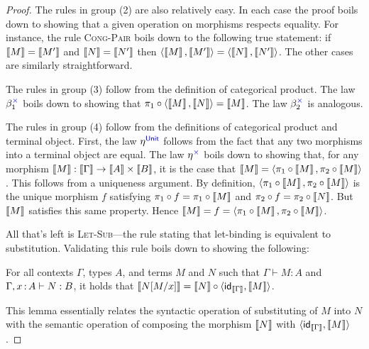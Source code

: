 \begin{proof}
  The rules in group (2) are also relatively easy.
  In each case the proof boils down to showing that
  a given operation on morphisms respects equality.
  For instance, the rule \textsc{Cong-Pair}
  boils down to the following true statement:
  if \(\left\llbracket M\right\rrbracket = \left\llbracket M'\right\rrbracket\)
  and \(\left\llbracket N\right\rrbracket = \left\llbracket N'\right\rrbracket\)
  then \(\langle \left\llbracket M\right\rrbracket,\left\llbracket M'\right\rrbracket\rangle = \langle \left\llbracket N\right\rrbracket,\left\llbracket N'\right\rrbracket\rangle\).
  The other cases are similarly straightforward.

  The rules in group (3) follow from the definition of categorical product.
  The law \(\beta^{\mathbin{{\color{blue}\times}}}_1\) boils down to showing that
  \(\pi_1 \circ \langle \left\llbracket M\right\rrbracket,\left\llbracket N\right\rrbracket\rangle = \left\llbracket M\right\rrbracket\).
  The law \(\beta^{\mathbin{{\color{blue}\times}}}_2\) is analogous.

  The rules in group (4) follow from the definitions of categorical product
  and terminal object. First, the law \(\eta^{\mathsf{{\color{blue}Unit}}}\)
  follows from the fact that any two morphisms into a terminal object are equal.
  The law \(\eta^{\mathbin{{\color{blue}\times}}}\) boils down to showing
  that, for any morphism \(\left\llbracket M\right\rrbracket : \left\llbracket \Gamma\right\rrbracket \to \left\llbracket A\right\rrbracket \times \left\llbracket B\right\rrbracket\),
  it is the case that \(\left\llbracket M\right\rrbracket = \langle \pi_1\circ \left\llbracket M\right\rrbracket, \pi_2\circ\left\llbracket M\right\rrbracket\rangle\).
  This follows from a uniqueness argument.
  By definition, \(\langle \pi_1\circ \left\llbracket M\right\rrbracket, \pi_2\circ\left\llbracket M\right\rrbracket\rangle\)
  is the unique morphism \(f\) satisfying \(\pi_1\circ f = \pi_1 \circ \left\llbracket M\right\rrbracket\)
  and \(\pi_2\circ f = \pi_2 \circ \left\llbracket N\right\rrbracket\). But \(\left\llbracket M\right\rrbracket\)
  satisfies this same property. Hence \(\left\llbracket M\right\rrbracket = f = \langle \pi_1\circ\left\llbracket M\right\rrbracket, \pi_2\circ\left\llbracket M\right\rrbracket\rangle\).

  All that's left is \textsc{Let-Sub}---the rule stating that let-binding is equivalent to substitution.
  Validating this rule boils down to showing the following:
  \begin{lemma} \label{lem:let-is-subst}
    For all contexts \(\Gamma\), types \(A\),
    and terms \(M\) and \(N\)
    such that \(\Gamma \vdash M : A\)
    and \(\Gamma,x\,{:}\, A \vdash N : B\),
    it holds that
    \(\left\llbracket N[M/x]\right\rrbracket = \left\llbracket N\right\rrbracket \circ \langle \mathsf{id}_{\left\llbracket \Gamma\right\rrbracket},\left\llbracket M\right\rrbracket\rangle\).
  \end{lemma}
  This lemma essentially relates
  the syntactic operation of substituting
  of \(M\) into \(N\)
  with the semantic operation
  of composing the morphism \(\left\llbracket N\right\rrbracket\) with \(\langle \mathsf{id}_{\left\llbracket \Gamma\right\rrbracket},\left\llbracket M\right\rrbracket\rangle\).


\end{proof}
